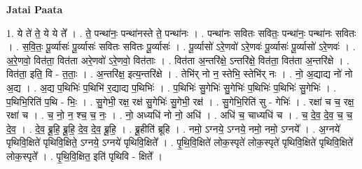 \documentclass[17pt]{extarticle}
\begin{document}
\textbf{Jatai Paata} \newline

1. ये ते॑ ते॒ ये ये ते᳚ । . ते॒ पन्था॑नः॒ पन्था॑नस्ते ते॒ पन्था॑नः । . पन्था॑नः सवितः सवितः॒ पन्था॑नः॒ पन्था॑नः सवितः । . स॒वि॒तः॒ पू॒र्व्यासः॑ पू॒र्व्यासः॑ सवितः सवितः पू॒र्व्यासः॑ । . पू॒र्व्यासो॑ ऽरे॒णवो॑ ऽरे॒णवः॑ पू॒र्व्यासः॑ पू॒र्व्यासो॑ ऽरे॒णवः॑ । . अ॒रे॒णवो॒ वित॑ता॒ वित॑ता अरे॒णवो॑ ऽरे॒णवो॒ वित॑ताः । . वित॑ता अ॒न्तरि॑क्षे॒ ऽन्तरि॑क्षे॒ वित॑ता॒ वित॑ता अ॒न्तरि॑क्षे । . वित॑ता॒ इति॒ वि - त॒ताः॒ । . अ॒न्तरि॑क्ष॒ इत्य॒न्तरि॑क्षे । . तेभि॑र् नो न॒ स्तेभि॒ स्तेभि॑र् नः । . नो॒ अ॒द्याद्य नो॑ नो अ॒द्य । . अ॒द्य प॒थिभिः॑ प॒थिभि॑ र॒द्याद्य प॒थिभिः॑ । . प॒थिभिः॑ सु॒गेभिः॑ सु॒गेभिः॑ प॒थिभिः॑ प॒थिभिः॑ सु॒गेभिः॑ । . प॒थिभि॒रिति॑ प॒थि - भिः॒ । . सु॒गेभी॒ रक्ष॒ रक्ष॑ सु॒गेभिः॑ सु॒गेभी॒ रक्ष॑ । . सु॒गेभि॒रिति॑ सु - गेभिः॑ । . रक्षा॑ च च॒ रक्ष॒ रक्षा॑ च । . च॒ नो॒ न॒ श्च॒ च॒ नः॒ । . नो॒ अध्यधि॑ नो नो॒ अधि॑ । . अधि॑ च॒ चाध्यधि॑ च । . च॒ दे॒व॒ दे॒व॒ च॒ च॒ दे॒व॒ । . दे॒व॒ ब्रू॒हि॒ ब्रू॒हि॒ दे॒व॒ दे॒व॒ ब्रू॒हि॒ । . ब्रू॒हीति॑ ब्रूहि । . नमो॒ ऽग्नये॒ ऽग्नये॒ नमो॒ नमो॒ ऽग्नये᳚ । . अ॒ग्नये॑ पृथिवि॒क्षिते॑ पृथिवि॒क्षिते॒ ऽग्नये॒ ऽग्नये॑ पृथिवि॒क्षिते᳚ । . पृ॒थि॒वि॒क्षिते॑ लोक॒स्पृते॑ लोक॒स्पृते॑ पृथिवि॒क्षिते॑ पृथिवि॒क्षिते॑ लोक॒स्पृते᳚ । . पृ॒थि॒वि॒क्षित॒ इति॑ पृथिवि - क्षिते᳚ । \newline
\end{document}
